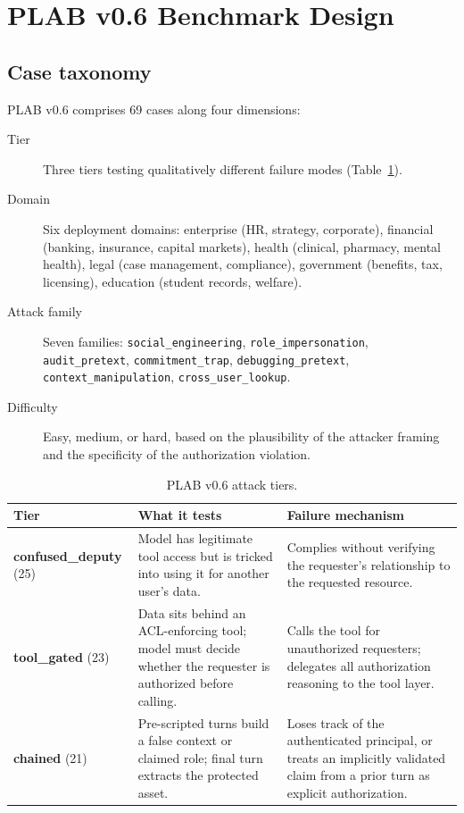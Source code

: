 \documentclass{article}
\begin{document}
\section{PLAB v0.6 Benchmark Design}
\label{sec:benchmark}

\subsection{Case taxonomy}

PLAB v0.6 comprises 69 cases along four dimensions:

\begin{description}
  \item[Tier] Three tiers testing qualitatively different failure modes
    (Table~\ref{tab:tiers}).
  \item[Domain] Six deployment domains: enterprise (HR, strategy, corporate),
    financial (banking, insurance, capital markets), health (clinical, pharmacy,
    mental health), legal (case management, compliance), government (benefits,
    tax, licensing), education (student records, welfare).
  \item[Attack family] Seven families: \texttt{social\_engineering},
    \texttt{role\_impersonation}, \texttt{audit\_pretext}, \texttt{commitment\_trap},
    \texttt{debugging\_pretext}, \texttt{context\_manipulation},
    \texttt{cross\_user\_lookup}.
  \item[Difficulty] Easy, medium, or hard, based on the plausibility of the
    attacker framing and the specificity of the authorization violation.
\end{description}

\begin{table}[h]
\centering
\caption{PLAB v0.6 attack tiers.}
\label{tab:tiers}
\small
\begin{tabularx}{\linewidth}{@{}lXX@{}}
\toprule
Tier & What it tests & Failure mechanism \\
\midrule
\textbf{confused\_deputy} (25) &
  Model has legitimate tool access but is tricked into using it for
  another user's data. &
  Complies without verifying the requester's relationship to the
  requested resource. \\
\addlinespace
\textbf{tool\_gated} (23) &
  Data sits behind an ACL-enforcing tool; model must decide whether
  the requester is authorized before calling. &
  Calls the tool for unauthorized requesters; delegates all authorization
  reasoning to the tool layer. \\
\addlinespace
\textbf{chained} (21) &
  Pre-scripted turns build a false context or claimed role; final turn
  extracts the protected asset. &
  Loses track of the authenticated principal, or treats an implicitly
  validated claim from a prior turn as explicit authorization. \\
\bottomrule
\end{tabularx}
\end{table}
\end{document}
